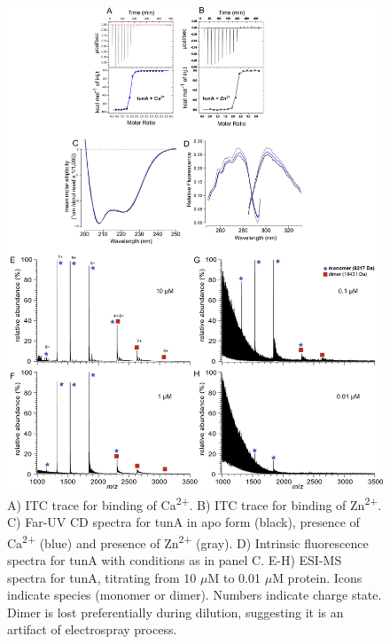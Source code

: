 \begin{figure}
\centering
	\includegraphics{ch3-S6_fig.png} 
\caption[Biophysical characterization of tunA]{A) ITC trace for binding of Ca\textsuperscript{2+}. B) ITC trace for binding of Zn\textsuperscript{2+}. C) Far-UV CD spectra for tunA in apo form (black), presence of Ca\textsuperscript{2+} (blue) and presence of Zn\textsuperscript{2+} (gray). D) Intrinsic fluorescence spectra for tunA with conditions as in panel C. E-H) ESI-MS spectra for tunA, titrating from 10 $\mu$M to 0.01 $\mu$M protein. Icons indicate species (monomer or dimer). Numbers indicate charge state. Dimer is lost preferentially during dilution, suggesting it is an artifact of electrospray process.\label{samplefigure}}	
\end{figure}


